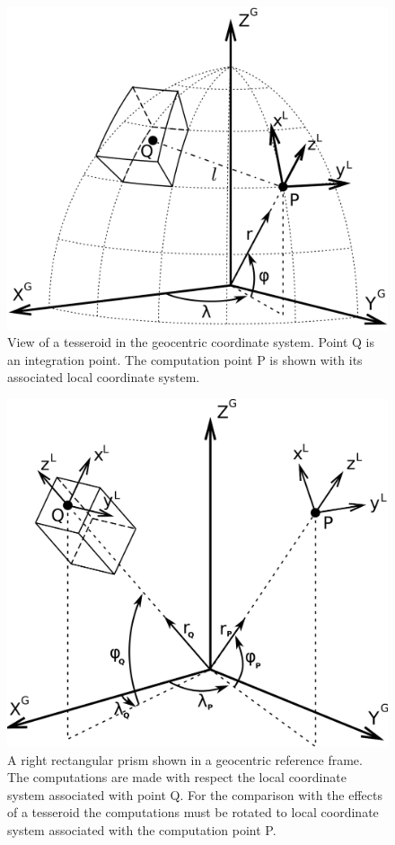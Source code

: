 \documentclass[a4paper,twocolumn]{esapub2005} %
\begin{document}
\begin{figure}[htb]
    \centering
        \includegraphics[width=\columnwidth]{../figures/tesseroid_coordsys_other.png}
    \caption{View of a tesseroid in the geocentric coordinate system. Point Q is an
    integration point. The computation point P is shown with its associated local
    coordinate system.
    \label{fig:tess-coords}}
\end{figure}
\begin{figure}[htb]
    \centering
        \includegraphics[width=\columnwidth]{../figures/coordinate_sys.png}
    \caption{A right rectangular prism shown in a geocentric reference frame.
    The computations are made with respect the local coordinate system associated
    with point Q. For the comparison with the effects of a tesseroid the computations
    must be rotated to local coordinate system associated with the computation point P.
    \label{fig:prism-coords}}
\end{figure}
\end{document}
